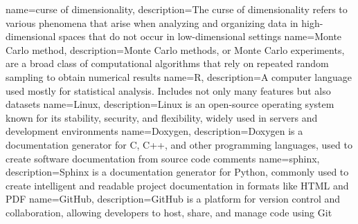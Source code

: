 {
name=curse of dimensionality,
description={The curse of dimensionality refers to various phenomena that arise when analyzing and organizing data in high-dimensional spaces that do not occur in low-dimensional settings}
}
{
	name=Monte Carlo method,
	description={Monte Carlo methods, or Monte Carlo experiments, are a broad class of computational algorithms that rely on repeated random sampling to obtain numerical results}
}
{
name=R,
description={A computer language used mostly for statistical analysis. Includes not only many features but also datasets}
}
{
name=Linux,
description={Linux is an open-source operating system known for its stability, security, and flexibility, widely used in servers and development environments}
}
{
name=Doxygen,
description={Doxygen is a documentation generator for C, C++, and other programming languages, used to create software documentation from source code comments}
}
{
name=sphinx,
description={Sphinx is a documentation generator for Python, commonly used to create intelligent and readable project documentation in formats like HTML and PDF}
}
{
name=GitHub,
description={GitHub is a platform for version control and collaboration, allowing developers to host, share, and manage code using Git}
}






